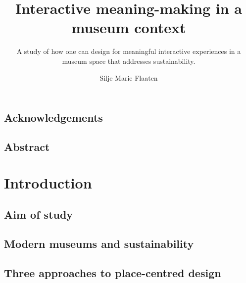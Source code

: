\documentclass[UKenglish]{ifimaster}
\title{Interactive meaning-making in a museum context}
\subtitle{A study of how one can design for meaningful interactive experiences in a museum space that addresses sustainability.}
\author{Silje Marie Flaaten}
\begin{document}
\duoforside[dept={Department of Informatics}, program={Informatics: design, use, interaction},long]
\frontmatter{}

\chapter*{Acknowledgements}


\chapter*{Abstract}


\tableofcontents{}
\listoffigures{}
\listoftables{}

\mainmatter{}

\part{Introduction}

\chapter{ Aim of study}


\chapter{ Modern museums and sustainability}


\chapter{ Three approaches to place-centred design}


\begin{comment}
\chapter{\ding{167} Hybrid place}


\chapter{Place as a dialogue}


\chapter{\ding{167} Sense-making}

\end{comment}
\end{document}
